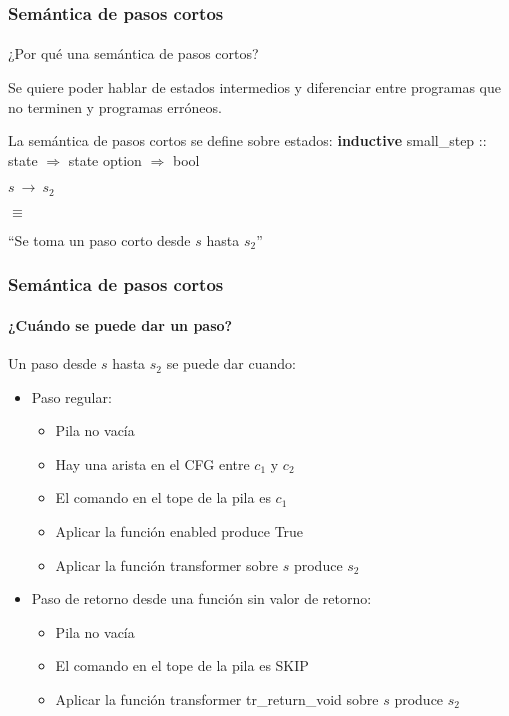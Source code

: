 \begin{frame}
\frametitle{Semántica de pasos cortos}
\framesubtitle{}

¿Por qué una semántica de pasos cortos?
\bigskip
\pause

Se quiere poder hablar de estados intermedios y diferenciar entre programas que no terminen y programas erróneos.

\bigskip
\pause


\begin{block}{La semántica de pasos cortos se define sobre estados:}
\textbf{inductive} small\_step :: state $\Rightarrow$ state option $\Rightarrow$ bool
\bigskip

$s\ \rightarrow\ s_2$

$\equiv$

``Se toma un paso corto desde $s$ hasta $s_2$''
\end{block}


\end{frame}


\begin{frame}
\frametitle{Semántica de pasos cortos}
\framesubtitle{¿Cuándo se puede dar un paso?}

Un paso desde $s$ hasta $s_2$ se puede dar cuando:
\begin{itemize}
\item{Paso regular:}
\begin{itemize}
\item{Pila no vacía}
\item{Hay una arista en el CFG entre $c_1$ y $c_2$}
\item{El comando en el tope de la pila es $c_1$}
\item{Aplicar la función enabled produce True}
\item{Aplicar la función transformer sobre $s$ produce $s_2$}
\end{itemize}
\item{Paso de retorno desde una función sin valor de retorno:}
\begin{itemize}
\item{Pila no vacía}
\item{El comando en el tope de la pila es SKIP}
\item{Aplicar la función transformer tr\_return\_void sobre $s$ produce $s_2$}
\end{itemize}
\end{itemize}

\end{frame}


